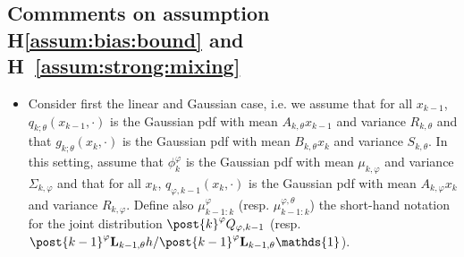 \documentclass{article}
\newcommand{\1}{\mathbbm{1}}
\newcommand{\uk}[1]{\mathbf{L}_{#1}}
\newcommand{\md}[1]{g_{#1}}
\newcommand{\parvec}{\theta}
\newcommand{\hd}[1]{q_{#1}}
\def\1{\mathds{1}}
\begin{document}
\subsection{Commments on assumption H\ref{assum:bias:bound} and H~\ref{assum:strong:mixing}}
\label{sec:assumptions}
\begin{itemize}
\item
Consider first the linear and Gaussian case, i.e. we assume that for all $x_{k-1}$, $\hd{k;\parvec}(x_{k-1}, \cdot)$ is the Gaussian pdf with mean $A_{k,\theta} x_{k-1}$ and variance $R_{k,\theta}$  and that $\md{k;\parvec}(x_{k},\cdot)$ is the Gaussian pdf with mean $B_{k,\theta} x_k$ and variance $S_{k,\theta}$. In this setting, assume that $\phi_k^\varphi$ is the Gaussian pdf with mean $\mu_{k,\varphi}$ and variance $\Sigma_{k,\varphi}$ and that for all $x_k$, $q_{\varphi,k-1}(x_{k}, \cdot)$ is the Gaussian pdf with mean $A_{k,\varphi} x_k$ and variance $R_{k,\varphi}$. Define also $\mu_{k-1:k}^\varphi$  (resp. $\mu_{k-1:k}^{\varphi,\theta}$) the short-hand notation for the joint distribution $\post{k}^{\varphi}Q_{\varphi,k-1} $ (resp. $\post{k-1}^{\varphi} \uk{k-1,\theta}h/\post{k-1}^{\varphi} \uk{k-1,\theta}\1$).


\end{itemize}
\end{document}
